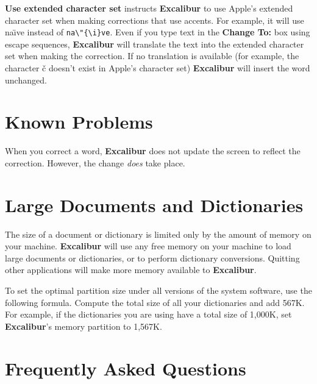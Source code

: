 ﻿\documentclass[11pt,titlepage]{article}
\newcommand{\ex}{\textbf{Excalibur}}
\begin{document}
\textbf{Use extended character set} instructs \ex{} to use Apple's
extended character set when making corrections that use accents.  For
example, it will use na\"{\i}ve instead of \verb+na\"{\i}ve+.  Even if
you type text in the \textbf{Change To:} box using escape sequences,
\ex{} will translate the text into the extended character set when
making the correction.  If no translation is available (for example,
the character \v{c} doesn't exist in Apple's character set) \ex{} will
insert the word unchanged.

\section{Known Problems}
\label{sec:problems}

When you correct a word, \ex{} does not update the screen to reflect
the correction. However, the change \emph{does} take place.

\section{Large Documents and Dictionaries}
\label{sec:large-docs}

The size of a document or dictionary is limited only by the amount of
memory on your machine.  \ex{} will use any free memory on your
machine to load large documents or dictionaries, or to perform
dictionary conversions.  Quitting other applications will make more
memory available to \ex.

To set the optimal partition size under all versions of the system
software, use the following formula.  Compute the total size of all
your dictionaries and add 567K.  For example, if the dictionaries you
are using have a total size of 1,000K, set \ex's memory partition to
1,567K.

\section{Frequently Asked Questions}
\label{seq:faq}
\end{document}
